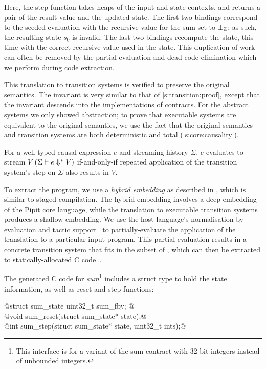 Here, the step function takes heaps of the input and state contexts, and returns a pair of the result value and the updated state.
The first two bindings correspond to the seeded evaluation with the recursive value for the sum set to $\bot_{\mathbb{Z}}$; as such, the resulting state $s_0$ is invalid.
The last two bindings recompute the state, this time with the correct recursive value used in the state.
This duplication of work can often be removed by the partial evaluation and dead-code-elimination which we perform during code extraction.

This translation to transition systems is verified to preserve the original semantics.
The invariant is very similar to that of \autoref{s:transition:proof}, except that the invariant descends into the implementations of contracts.
For the abstract systems we only showed abstraction; to prove that executable systems are equivalent to the original semantics, we use the fact that the original semantics and transition systems are both deterministic and total (\autoref{s:core:causality}).

\begin{theorem}
  For a well-typed causal expression $e$ and streaming history $\Sigma$, $e$ evaluates to stream $V$ $(\Sigma \vdash e \Downarrow^{*} V)$ if-and-only-if repeated application of the transition system's step on $\Sigma$ also results in $V$.
\end{theorem}

To extract the program, we use a \emph{hybrid embedding} as described in \cite{ho2022noise}, which is similar to staged-compilation.
The hybrid embedding involves a deep embedding of the Pipit core language, while the translation to executable transition systems produces a shallow embedding.
We use the \fstar{} host language's normalisation-by-evaluation and tactic support~\cite{martinez2019meta} to partially-evaluate the application of the translation to a particular input program.
This partial-evaluation results in a concrete transition system that fits in the \lowstar{} subset of \fstar{}, which can then be extracted to statically-allocated C code~\cite{protzenko2017verified}.

The generated C code for \emph{sum}\footnote{This interface is for a variant of the sum contract with 32-bit integers instead of unbounded integers.} includes a struct type to hold the state information, as well as reset and step functions:
  \begin{tabbing}
    @struct sum_state { uint32_t sum_fby; }@ \\
    @void   sum_reset(struct sum_state* state);@ \\
    @int    sum_step(struct sum_state* state, uint32_t ints);@
  \end{tabbing}

